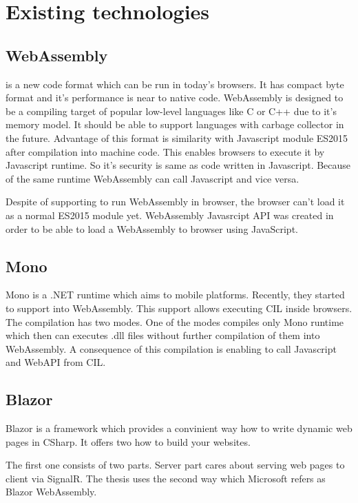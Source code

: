 \chapter{Existing technologies}

\section{WebAssembly}

\cite{WebAssembly} is a new code format which can be run in today's browsers. 
It has compact byte format and it's performance is near to native code. 
WebAssembly is designed to be a compiling target of popular low-level languages like C or C++ due to it's memory model. 
It should be able to support languages with carbage collector in the future. Advantage of this format is similarity with Javascript module ES2015 after compilation into machine code. 
This enables browsers to execute it by Javascript runtime. 
So it's security is same as code written in Javascript. 
Because of the same runtime WebAssembly can call Javascript and vice versa.

Despite of supporting to run WebAssembly in browser, the browser can't load it as a normal ES2015 module yet.
WebAssembly Javasrcipt API was created in order to be able to load a WebAssembly to browser using JavaScript.

\section{Mono}

Mono is a .NET runtime which aims to mobile platforms. 
Recently, they started to support \cite{compilation} into WebAssembly.
This support allows executing CIL inside browsers.
The compilation has two modes. 
One of the modes compiles only Mono runtime which then  can executes .dll files without further compilation of them into WebAssembly.
A consequence of this compilation is enabling to call Javascript and WebAPI from CIL.

\section{Blazor}

Blazor is a framework which provides a convinient way how to write dynamic web pages in CSharp.
It offers two \cite{Hosting_models} how to build your websites.

The first one consists of two parts. Server part cares about serving web pages to client via SignalR.
The thesis uses the second way which Microsoft refers as Blazor WebAssembly.


